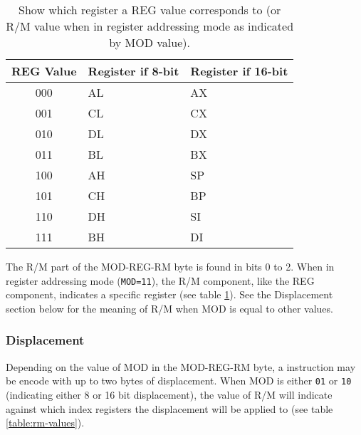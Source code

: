         \begin{table}[h]
            \centering
            \begin{tabular} { | c | m{} | m{} | }
                \hline
                REG Value & Register if 8-bit & Register if 16-bit \\
                \hline
                000 & AL & AX \\
                001 & CL & CX \\
                010 & DL & DX \\
                011 & BL & BX \\
                100 & AH & SP \\
                101 & CH & BP \\
                110 & DH & SI \\
                111 & BH & DI \\
                \hline
            \end{tabular}
            \caption{Show which register a REG value corresponds to (or R/M value when in register addressing mode as indicated by MOD value).}
            \label{table:reg-addressing}
        \end{table}

        The R/M part of the MOD-REG-RM byte is found in bits 0 to 2. When in register addressing mode (\texttt{MOD=11}), the R/M component, like the REG component, indicates a specific register (see table \ref{table:reg-addressing}). See the Displacement section below for the meaning of R/M when MOD is equal to other values.

    \subsubsection{Displacement}
        Depending on the value of MOD in the MOD-REG-RM byte, a instruction may be encode with up to two bytes of displacement. When MOD is either \texttt{01} or \texttt{10} (indicating either 8 or 16 bit displacement), the value of R/M will indicate against which index registers the displacement will be applied to (see table \ref{table:rm-values}).

